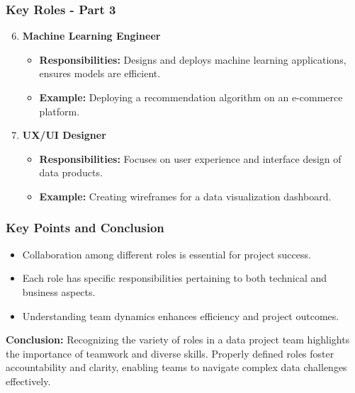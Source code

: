 \documentclass[aspectratio=169]{beamer}
\begin{document}
\begin{frame}[fragile]
    \frametitle{Key Roles - Part 3}
    \begin{enumerate}
        \setcounter{enumi}{5}
        \item \textbf{Machine Learning Engineer}
            \begin{itemize}
                \item \textbf{Responsibilities:} Designs and deploys machine learning applications, ensures models are efficient.
                \item \textbf{Example:} Deploying a recommendation algorithm on an e-commerce platform.
            \end{itemize}

        \item \textbf{UX/UI Designer}
            \begin{itemize}
                \item \textbf{Responsibilities:} Focuses on user experience and interface design of data products.
                \item \textbf{Example:} Creating wireframes for a data visualization dashboard.
            \end{itemize}
    \end{enumerate}
\end{frame}

\begin{frame}[fragile]
    \frametitle{Key Points and Conclusion}
    \begin{itemize}
        \item Collaboration among different roles is essential for project success.
        \item Each role has specific responsibilities pertaining to both technical and business aspects.
        \item Understanding team dynamics enhances efficiency and project outcomes.
    \end{itemize}
    
    \textbf{Conclusion:} Recognizing the variety of roles in a data project team highlights the importance of teamwork and diverse skills. Properly defined roles foster accountability and clarity, enabling teams to navigate complex data challenges effectively.
\end{frame}
\end{document}
